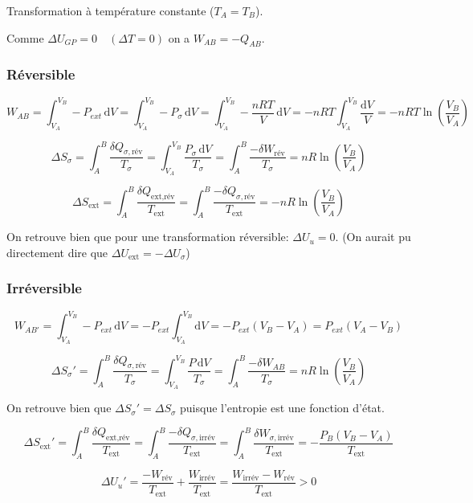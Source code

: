 \documentclass[a4paper,12pt]{article}
\newcommand{\diff}{\mathrm{d}} %
\begin{document}
        Transformation à température constante ($T_A=T_B$).
        
        Comme $ \Delta U_{GP} = 0 \quad (\Delta T = 0) $ on a $W_{AB} = -Q_{AB}$.

        \subsubsection{Réversible}
            $$ W_{AB} = \int_{V_A}^{V_B} -P_{ext} \, \diff V = \int_{V_A}^{V_B} -P_\sigma \, \diff V = \int_{V_A}^{V_B} -\frac{nRT}{V} \, \diff V = -nRT \int_{V_A}^{V_B} \frac{\diff V}{V} = -nRT \ln{\left(\frac{V_B}{V_A}\right)} $$
            
            $$ \Delta S_\sigma = \int_A^B \frac{\delta Q_{\sigma,\text{rév}}}{T_\sigma} = \int_{V_A}^{V_B} \frac{P_\sigma \, \diff V}{T_\sigma} = \int_A^B \frac{-\delta W_{\text{rév}}}{T_\sigma} = n R \ln{\left(\frac{V_B}{V_A}\right)} $$

            $$ \Delta S_{\text{ext}} = \int_A^B \frac{\delta Q_{\text{ext,rév}}}{T_{\text{ext}}} = \int_A^B \frac{-\delta Q_{\sigma,\text{rév}}}{T_{\text{ext}}} = - n R \ln{\left(\frac{V_B}{V_A}\right)} $$

            On retrouve bien que pour une transformation réversible: $\Delta U_u = 0$. (On aurait pu directement dire que $\Delta U_{\text{ext}} = -\Delta U_\sigma$)

        \subsubsection{Irréversible}
            $$ W_{AB'} = \int_{V_A}^{V_B} -P_{ext} \, \diff V = -P_{ext} \int_{V_A}^{V_B} \diff V = -P_{ext} (V_B - V_A) = P_{ext} (V_A- V_B) $$

            $$ \Delta S_\sigma' = \int_A^B \frac{\delta Q_{\sigma,\text{rév}}}{T_\sigma} = \int_{V_A}^{V_B} \frac{P \, \diff V}{T_\sigma} = \int_A^B \frac{-\delta W_{AB}}{T_\sigma} = n R \ln{\left(\frac{V_B}{V_A}\right)} $$

            On retrouve bien que $\Delta S_\sigma' = \Delta S_\sigma$ puisque l'entropie est une fonction d'état.
            
            $$ \Delta S_{\text{ext}}' = \int_A^B \frac{\delta Q_{\text{ext,rév}}}{T_{\text{ext}}} = \int_A^B \frac{-\delta Q_{\sigma,\text{irrév}}}{T_{\text{ext}}} = \int_A^B \frac{\delta W_{\sigma,\text{irrév}}}{T_{\text{ext}}} = -\frac{P_B (V_B - V_A)}{T_{\text{ext}}} $$

            $$ \Delta U_u' = \frac{-W_{\text{rév}}}{T_{\text{ext}}} + \frac{W_{\text{irrév}}}{T_{\text{ext}}} = \frac{W_{\text{irrév}} - W_{\text{rév}}}{T_{\text{ext}}} > 0 $$
\end{document}
